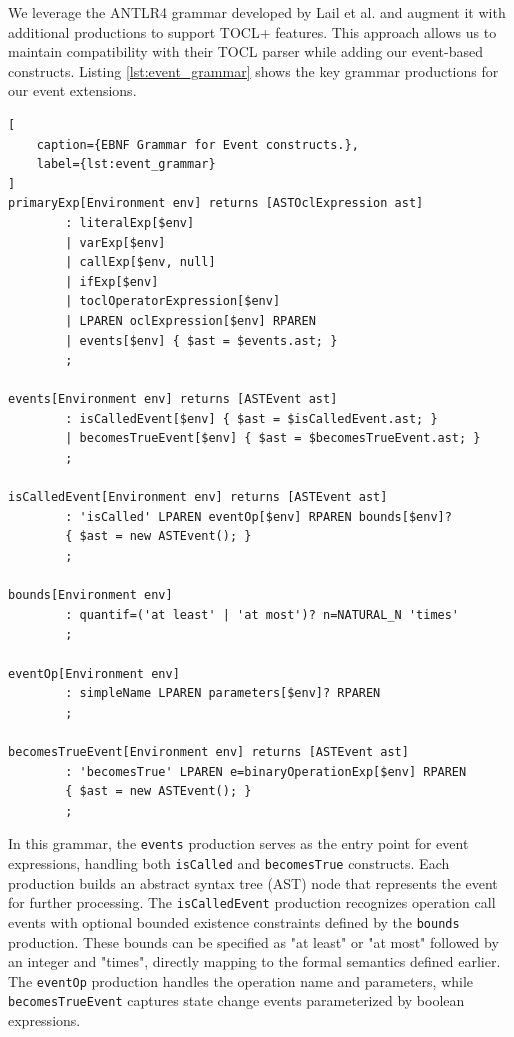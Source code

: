 We leverage the ANTLR4 grammar developed by Lail et al. and augment it with 
additional productions to support TOCL+ features. This approach allows us to 
maintain compatibility with their TOCL parser while adding our event-based 
constructs. Listing \ref{lst:event_grammar} shows the key grammar productions 
for our event extensions.

\begin{lstlisting}[
    caption={EBNF Grammar for Event constructs.}, 
    label={lst:event_grammar}
]
primaryExp[Environment env] returns [ASTOclExpression ast]
        : literalExp[$env]
        | varExp[$env]
        | callExp[$env, null]
        | ifExp[$env]
        | toclOperatorExpression[$env]
        | LPAREN oclExpression[$env] RPAREN
        | events[$env] { $ast = $events.ast; }
        ;

events[Environment env] returns [ASTEvent ast]
        : isCalledEvent[$env] { $ast = $isCalledEvent.ast; }
        | becomesTrueEvent[$env] { $ast = $becomesTrueEvent.ast; }
        ;

isCalledEvent[Environment env] returns [ASTEvent ast]
        : 'isCalled' LPAREN eventOp[$env] RPAREN bounds[$env]?
        { $ast = new ASTEvent(); }
        ;

bounds[Environment env]
        : quantif=('at least' | 'at most')? n=NATURAL_N 'times'
        ;

eventOp[Environment env]
        : simpleName LPAREN parameters[$env]? RPAREN
        ;

becomesTrueEvent[Environment env] returns [ASTEvent ast]
        : 'becomesTrue' LPAREN e=binaryOperationExp[$env] RPAREN
        { $ast = new ASTEvent(); }
        ;
\end{lstlisting}

In this grammar, the \texttt{events} production serves as the entry point for event 
expressions, handling both \texttt{isCalled} and \texttt{becomesTrue} constructs. 
Each production builds an abstract syntax tree (AST) node that represents the event 
for further processing. The \texttt{isCalledEvent} production recognizes operation 
call events with optional bounded existence constraints defined by the \texttt{bounds} 
production. These bounds can be specified as "at least" or "at most" followed by 
an integer and "times", directly mapping to the formal semantics defined earlier. 
The \texttt{eventOp} production handles the operation name and parameters, while 
\texttt{becomesTrueEvent} captures state change events parameterized by boolean 
expressions.

